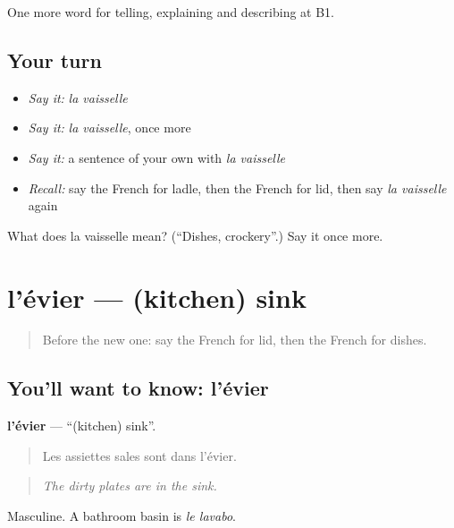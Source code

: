 \begin{grammarlens}[title={What you've built}]
One more word for telling, explaining and describing at B1.
\end{grammarlens}

\subsection*{Your turn}
\begin{itemize}
\raggedright
  \item \emph{Say it:} \emph{la vaisselle}
  \item \emph{Say it:} \emph{la vaisselle}, once more
  \item \emph{Say it:} a sentence of your own with \emph{la vaisselle}
  \item \emph{Recall:} say the French for ladle, then the French for lid, then say \emph{la vaisselle} again
\end{itemize}

\begin{tcolorbox}[breakable,colback=teal!4,colframe=teal!35!black,title={Before you move on}]
What does la vaisselle mean? (\textquotedblleft{}Dishes, crockery\textquotedblright{}.) Say it once more.
\end{tcolorbox}
\section[l'évier]{l'évier — (kitchen) sink}

\label{lesson:FR-C530-evier}



\begin{quote}
Before the new one: say the French for lid, then the French for dishes.
\end{quote}

\subsection*{You'll want to know: l'évier}
\textbf{l'évier} — \textquotedblleft{}(kitchen) sink\textquotedblright{}.

\begin{quote}
Les assiettes sales sont dans l'évier.
\end{quote}

\begin{quote}
\emph{The dirty plates are in the sink.}
\end{quote}

Masculine. A bathroom basin is \emph{le lavabo}.

